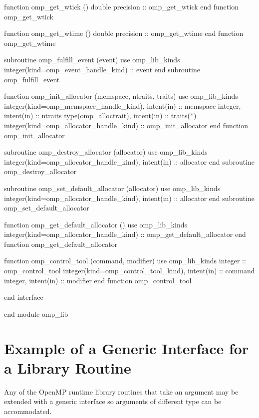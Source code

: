 {\begin{ompfFunction}
    function omp_get_wtick ()
      double precision :: omp_get_wtick
    end function omp_get_wtick

    function omp_get_wtime ()
      double precision :: omp_get_wtime
    end function omp_get_wtime

    subroutine omp_fulfill_event (event)
      use omp_lib_kinds
      integer(kind=omp_event_handle_kind) :: event
    end subroutine omp_fulfill_event

    function omp_init_allocator (memspace, ntraits, traits)
      use omp_lib_kinds
      integer(kind=omp_memspace_handle_kind), intent(in) :: memspace
      integer, intent(in) :: ntraits
      type(omp_alloctrait), intent(in) :: traits(*)
      integer(kind=omp_allocator_handle_kind) :: omp_init_allocator
    end function omp_init_allocator

    subroutine omp_destroy_allocator (allocator)
      use omp_lib_kinds
      integer(kind=omp_allocator_handle_kind), intent(in) :: allocator
    end subroutine omp_destroy_allocator

    subroutine omp_set_default_allocator (allocator)
      use omp_lib_kinds
      integer(kind=omp_allocator_handle_kind), intent(in) :: allocator
    end subroutine omp_set_default_allocator

    function omp_get_default_allocator ()
      use omp_lib_kinds
      integer(kind=omp_allocator_handle_kind) :: omp_get_default_allocator
    end function omp_get_default_allocator

    function omp_control_tool (command, modifier)
      use omp_lib_kinds
      integer :: omp_control_tool
      integer(kind=omp_control_tool_kind), intent(in) :: command
      integer, intent(in) :: modifier
    end function omp_control_tool

  end interface

end module omp_lib
\end{ompfFunction}} %






\section{Example of a Generic Interface for a Library Routine}
\label{sec:Example of a Generic Interface for a Library Routine}
Any of the OpenMP runtime library routines that take an argument may be extended
with a generic interface so arguments of different  type can be accommodated.


